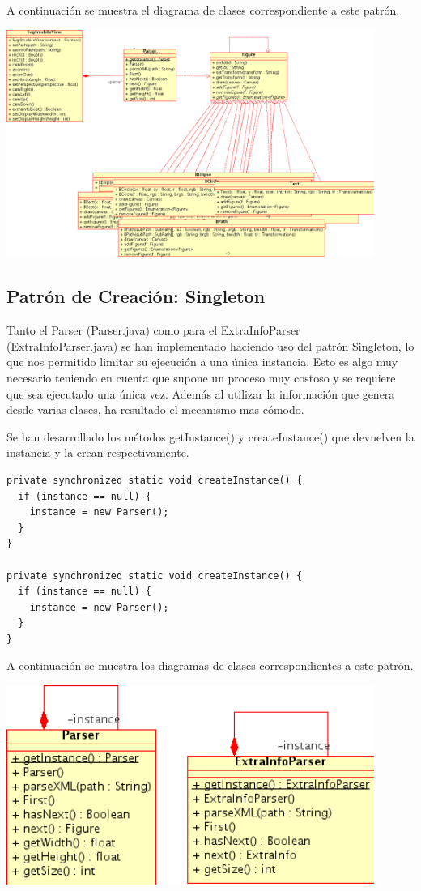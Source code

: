 \documentclass[a4paper,10pt]{article}
\begin{document}
A continuación se muestra el diagrama de clases correspondiente a este patrón.

\begin{center}
 \includegraphics[width=12cm]{texres/builder.png}
\end{center}

\subsection{Patrón de Creación: Singleton}

Tanto el Parser (Parser.java) como para el ExtraInfoParser (ExtraInfoParser.java) se han implementado haciendo uso del patrón Singleton, lo que nos permitido limitar su ejecución a una única instancia. Esto es algo muy necesario teniendo en cuenta que supone un proceso muy costoso y se requiere que sea ejecutado una única vez. Además al utilizar la información que genera desde varias clases, ha resultado el mecanismo mas cómodo.

Se han desarrollado los métodos getInstance() y createInstance() que devuelven la instancia y la crean respectivamente.

\begin{verbatim}
private synchronized static void createInstance() {
  if (instance == null) {
    instance = new Parser();
  }
}

private synchronized static void createInstance() {
  if (instance == null) {
    instance = new Parser();
  }
}
\end{verbatim} 

A continuación se muestra los diagramas de clases correspondientes a este patrón.

\begin{center}
 \includegraphics[width=12cm]{texres/singleton.png}
\end{center}
\end{document}

